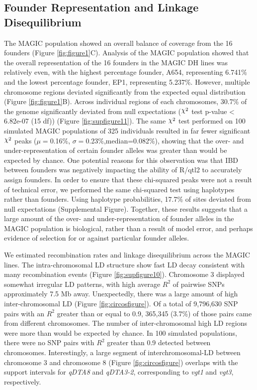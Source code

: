 \documentclass[article,9pt,twocolumn,twoside]{rilabRxiv}
\DeclareRobustCommand{\rchi}{{\mathpalette\irchi\relax}}
\newcommand{\irchi}[2]{\raisebox{\depth}{$#1\chi$}} %
\begin{document}

\subsection{Founder Representation and Linkage Disequilibrium}

The MAGIC population showed an overall balance of coverage from the 16 founders (Figure \ref{fig:figure1}C).
Analysis of the MAGIC population showed that the overall representation of the 16 founders in the MAGIC DH lines was relatively even, with the highest percentage founder, A654, representing 6.741\% and the lowest percentage founder, EP1, representing 5.237\%.
However, multiple chromosome regions deviated significantly from the expected equal distribution (Figure \ref{fig:figure1}B).
Across individual regions of each chromosomes, 30.7\% of the genome significantly deviated from null expectations ($\rchi^2$ test p-value < 6.82e-07 (15 df)) (Figure \ref{fig:supfigure11}).
The same $\rchi^2$ test performed on 100 simulated MAGIC populations of 325 individuals resulted in far fewer significant $\rchi^2$ peaks ($\mu=$0.16\%, $\sigma=$0.23\%,median=0.082\%), showing that the over- and under-representation of certain founder alleles was greater than would be expected by chance.
One potential reasons for this observation was that IBD between founders was negatively impacting the ability of R/qtl2 to accurately assign founders.
In order to ensure that these chi-squared peaks were not a result of technical error, we performed the same chi-squared test using haplotypes rather than founders.
Using haplotype probabilities, 17.7\% of sites deviated from null expectations (Supplemental Figure).
Together, these results suggests that a large amount of the over- and under-representation of founder alleles in the MAGIC population is biological, rather than a result of model error, and perhaps evidence of selection for or against particular founder alleles.

We estimated recombination rates and linkage disequilibrium across the MAGIC lines.
The intra-chromosomal LD structure show fast LD decay consistent with many recombination events (Figure \ref{fig:supfigure10}).
Chromosome 3 displayed somewhat irregular LD patterns, with high average $R^2$ of pairwise SNPs approximately 7.5 Mb away.
Unexpectedly, there was a large amount of high inter-chromosomal LD (Figure \ref{fig:circosfigure}).
Of a total of 9,796,630 SNP pairs with an $R^2$ greater than or equal to 0.9, 365,345 (3.7\%) of those pairs came from different chromosomes.
The number of inter-chromosomal high LD regions were more than would be expected by chance. In 100 simulated populations, there were no SNP pairs with $R^2$ greater than 0.9 detected between chromosomes.
Interestingly, a large segment of interchromosomal-LD between chromosome 3 and chromosome 8 (Figure \ref{fig:circosfigure}) overlaps with the support intervals for \emph{qDTA8} and \emph{qDTA3-2}, corresponding to \emph{vgt1} and \emph{vgt3}, respectively.
\end{document}
